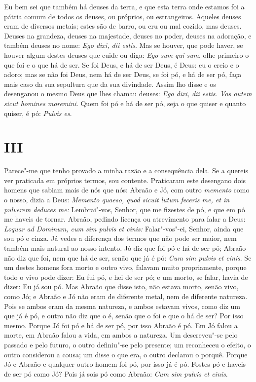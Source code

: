 Eu bem sei que também há deuses da terra, e que esta terra onde
estamos foi a pátria comum de todos os deuses, ou próprios, ou
estrangeiros. Aqueles deuses eram de diversos metais; estes são de
barro, ou cru ou mal cozido, mas deuses. Deuses na grandeza, deuses na
majestade, deuses no poder, deuses na adoração, e
também deuses no nome: \emph{Ego dixi, dii estis}. Mas se houver, que
pode haver, se houver algum destes deuses que cuide ou diga: \emph{Ego
sum qui sum}, olhe primeiro o que foi e o que há de ser. Se foi Deus, e
há de ser Deus, é Deus: eu o creio e o adoro; mas se não foi Deus, nem
há de ser Deus, se foi pó, e há de ser pó, faça mais caso da sua
sepultura que da sua divindade. Assim lho disse e os desenganou o mesmo
Deus que lhes chamau deuses: \emph{Ego dixi, dii estis. Vos outem sicut
homines moremini}. Quem foi pó e há de ser pó, seja o que quiser e
quanto quiser, é pó: \emph{Pulvis es}.

\section{III}

Parece"-me que tenho provado a minha razão e a consequência dela. Se a
quereis ver praticada em próprios termos, sou contente. Praticaram este
desengano dois homens que sabiam mais de nós que nós: Abraão e Jó, com
outro \emph{memento} como o nosso, dizia a Deus: \emph{Memento quaeso,
quod sicuit lutum feceris me, et in pulverem deduces me:} Lembrai"-vos,
Senhor, que me fizestes de pó, e que em pó me haveis de tornar. %
Abraão, pedindo licença ou atrevimento para falar a Deus:
\emph{Loquar ad Dominum, cum sim pulvis et cinis:} Falar"-vos"-ei, Senhor,
ainda que sou pó e cinza. Já vedes a diferença dos %
termos que não pode ser maior, nem também mais natural ao nosso intento.
Jó diz que foi pó e há de ser pó; Abraão não diz que foi, nem que há de
ser, senão que já é pó: \emph{Cum sim pulvis et cinis}. Se um destes
homens fora morto e outro vivo, falavam muito propriamente, porque todo
o vivo pode dizer: Eu fui pó, e hei de ser pó; e um morto, se falar,
havia de dizer: Eu já sou pó. Mas Abraão que disse isto, não estava
morto, senão vivo, como Jó; e Abraão e Jó não eram de diferente metal,
nem de diferente natureza. Pois se ambos eram da mesma natureza, e ambos
estavam vivos, como diz um que já é pó, e outro não diz que o é, senão
que o foi e que o há de ser? Por isso mesmo. Porque Jó foi pó e há de
ser pó, por isso Abraão é pó. Em Jó falou a morte, em
Abraão falou a vida, em ambos a natureza. Um descreveu"-se pelo passado e
pelo futuro, o outro definiu"-se pelo presente; um reconheceu o efeito, o
outro considerou a cousa; um disse o que era, o outro declarou o porquê.
Porque Jó e Abraão e qualquer outro homem foi pó, por isso já é pó.
Fostes pó e haveis de ser pó como Jó? Pois já sois pó como Abraão:
\emph{Cum sim pulvis et cinis}.

